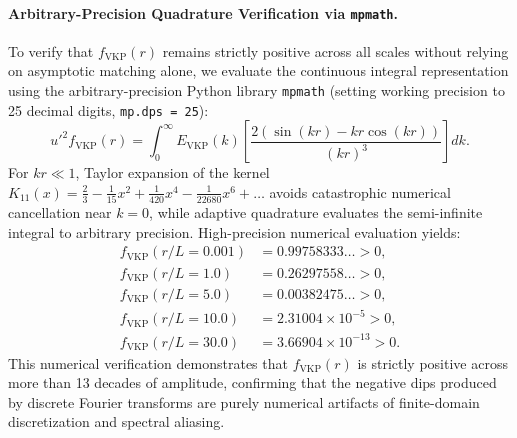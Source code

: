 \documentclass[lineno]{jfm}
\begin{document}
\paragraph{Arbitrary-Precision Quadrature Verification via \texttt{mpmath}.}
To verify that $f_{\text{VKP}}(r)$ remains strictly positive across all scales without relying on asymptotic matching alone, we evaluate the continuous integral representation using the arbitrary-precision Python library \texttt{mpmath} (setting working precision to 25 decimal digits, \texttt{mp.dps = 25}):
\begin{equation}
u'^2 f_{\text{VKP}}(r) = \int_0^\infty E_{\text{VKP}}(k) \left[ \frac{2(\sin(kr) - kr\cos(kr))}{(kr)^3} \right] dk.
\end{equation}
For $k r \ll 1$, Taylor expansion of the kernel $K_{11}(x) = \frac{2}{3} - \frac{1}{15}x^2 + \frac{1}{420}x^4 - \frac{1}{22680}x^6 + \dots$ avoids catastrophic numerical cancellation near $k=0$, while adaptive quadrature evaluates the semi-infinite integral to arbitrary precision. High-precision numerical evaluation yields:
\begin{align}
f_{\text{VKP}}(r/L = 0.001) &= 0.99758333\dots > 0, \nonumber \\
f_{\text{VKP}}(r/L = 1.0) &= 0.26297558\dots > 0, \nonumber \\
f_{\text{VKP}}(r/L = 5.0) &= 0.00382475\dots > 0, \nonumber \\
f_{\text{VKP}}(r/L = 10.0) &= 2.31004\times 10^{-5} > 0, \nonumber \\
f_{\text{VKP}}(r/L = 30.0) &= 3.66904\times 10^{-13} > 0.
\end{align}
This numerical verification demonstrates that $f_{\text{VKP}}(r)$ is strictly positive across more than 13 decades of amplitude, confirming that the negative dips produced by discrete Fourier transforms are purely numerical artifacts of finite-domain discretization and spectral aliasing.



\end{document}
